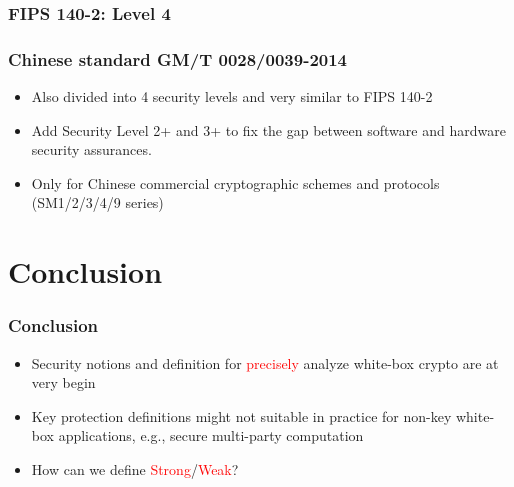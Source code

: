 \documentclass{beamer}
\begin{document}
\frame
{
\frametitle{FIPS 140-2: Level 4}

\begin{center}
\end{center}

}

\frame
{
\frametitle{Chinese standard GM/T 0028/0039-2014}
\begin{itemize}
\setlength{\itemsep}{12pt}
\item Also divided into 4 security levels and very similar to FIPS 140-2

\item Add Security Level 2+ and 3+ to fix the gap between software and hardware security assurances.

\item Only for Chinese commercial cryptographic schemes and protocols (SM1/2/3/4/9 series)

\end{itemize}
}


\section{Conclusion}

\frame
{
\frametitle{Conclusion}

\begin{itemize}
\setlength{\itemsep}{12pt}
\item Security notions and definition for \textcolor{red}{precisely} analyze white-box crypto are at very begin

\item Key protection definitions might not suitable in practice for non-key white-box applications, e.g., secure multi-party computation

\item How can we define \textcolor{red}{Strong}/\textcolor{red}{Weak}?
\end{itemize}

}
\end{document}
